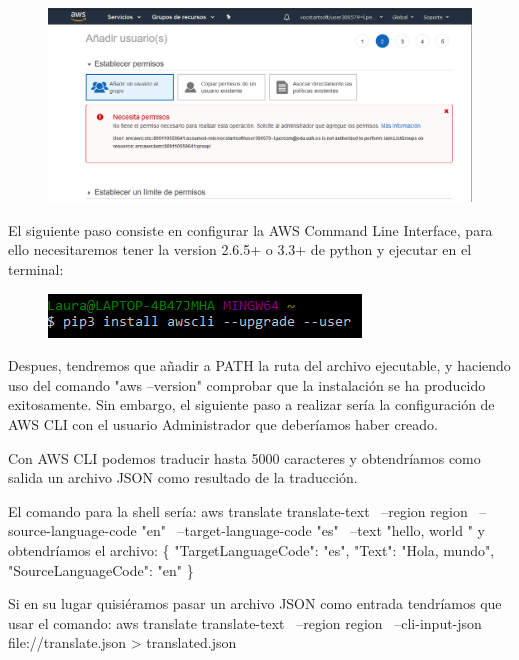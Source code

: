\documentclass[english,runningheads,a4paper]{llncs}[2018/03/10]
\begin{document}
    \begin{figure}[H]
        \centering
        \includegraphics[scale=0.5]{./IA/AWS/denyedpermissionAWS.png}
    \end{figure}
    
    El siguiente paso consiste en configurar la AWS Command Line Interface, 
    para  ello necesitaremos tener la version 2.6.5+ o 3.3+ de python y 
    ejecutar en el terminal:
    
    \begin{figure}[H]
        \centering
        \includegraphics[scale=0.5]{./IA/AWS/pipAWS.png}
    \end{figure}
    
    Despues, tendremos que añadir a PATH la ruta del archivo ejecutable, y 
    haciendo uso del comando "aws --version" comprobar que la instalación se ha 
    producido exitosamente. Sin embargo, el siguiente paso a realizar sería la 
    configuración de AWS CLI con el usuario Administrador que deberíamos haber 
    creado.
    
    Con AWS CLI podemos traducir hasta 5000 caracteres y obtendríamos como 
    salida un archivo JSON como resultado de la traducción.
    
    El comando para la shell sería:
    aws translate translate-text \
    --region region \
    --source-language-code "en" \
    --target-language-code "es" \
    --text "hello, world " 
    y obtendríamos el archivo:
    \{
    "TargetLanguageCode": "es",
    "Text": "Hola, mundo",
    "SourceLanguageCode": "en"
    \}
    
    Si en su lugar quisiéramos pasar un archivo JSON como entrada tendríamos 
    que usar el comando:
    aws translate translate-text \
    --region region \
    --cli-input-json file://translate.json > translated.json
    
\end{document}
